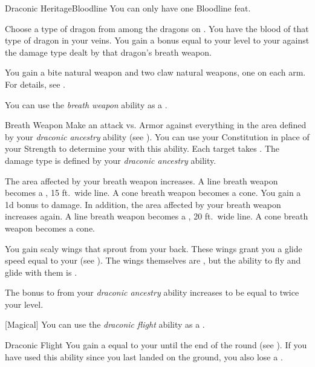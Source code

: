     \begin{feat}{Draconic Heritage}{Bloodline}
         You can only have one Bloodline feat.

         Choose a type of dragon from among the dragons on .
        You have the blood of that type of dragon in your veins.
        You gain a bonus equal to your level to your  against the damage type dealt by that dragon's breath weapon.

         You gain a bite natural weapon and two claw natural weapons, one on each arm.
        For details, see .

         You can use the \textit{breath weapon} ability as a .
        \begin{freeability}{Breath Weapon}
            Make an attack vs. Armor against everything in the area defined by your \textit{draconic ancestry} ability (see ).
            You can use your Constitution in place of your Strength to determine your  with this ability.
            \hit Each target takes .
            The damage type is defined by your \textit{draconic ancestry} ability.

            \rankline
             The area affected by your breath weapon increases.
                A line breath weapon becomes a \areahuge, 15 ft.\ wide line.
                A cone breath weapon becomes a \arealarge cone.
             You gain a \plus1d bonus to damage.
                In addition, the area affected by your breath weapon increases again.
                A line breath weapon becomes a \areahuge, 20 ft.\ wide line.
                A cone breath weapon becomes a \areahuge cone.
        \end{freeability}

         You gain scaly wings that sprout from your back.
        These wings grant you a glide speed equal to your  (see ).
        The wings themselves are , but the ability to fly and glide with them is .

         The bonus to  from your \textit{draconic ancestry} ability increases to be equal to twice your level.

        [Magical] You can use the \textit{draconic flight} ability as a .
        \begin{freeability}{Draconic Flight}
            You gain a  equal to your  until the end of the round (see ).
            If you have used this ability since you last landed on the ground, you also lose a .
        \end{freeability}


\end{feat}
